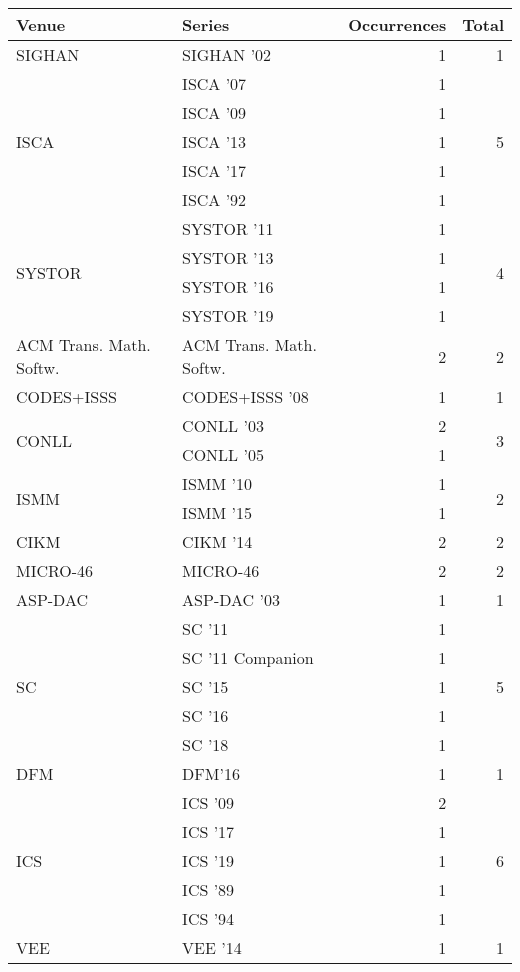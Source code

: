 \begin{table*}[t]
\begin{tabular}{llrr}
Venue & Series & Occurrences & Total\\\hline
\multirow{1}{*}{SIGHAN } & SIGHAN '02 & 1 & \multirow{1}{*}{1}\\
\multirow{5}{*}{ISCA } & ISCA '07 & 1 & \multirow{5}{*}{5}\\
& ISCA '09 & 1 &\\
& ISCA '13 & 1 &\\
& ISCA '17 & 1 &\\
& ISCA '92 & 1 &\\
\multirow{4}{*}{SYSTOR } & SYSTOR '11 & 1 & \multirow{4}{*}{4}\\
& SYSTOR '13 & 1 &\\
& SYSTOR '16 & 1 &\\
& SYSTOR '19 & 1 &\\
\multirow{1}{*}{ACM Trans. Math. Softw.} & ACM Trans. Math. Softw. & 2 & \multirow{1}{*}{2}\\
\multirow{1}{*}{CODES+ISSS } & CODES+ISSS '08 & 1 & \multirow{1}{*}{1}\\
\multirow{2}{*}{CONLL } & CONLL '03 & 2 & \multirow{2}{*}{3}\\
& CONLL '05 & 1 &\\
\multirow{2}{*}{ISMM } & ISMM '10 & 1 & \multirow{2}{*}{2}\\
& ISMM '15 & 1 &\\
\multirow{1}{*}{CIKM } & CIKM '14 & 2 & \multirow{1}{*}{2}\\
\multirow{1}{*}{MICRO-46} & MICRO-46 & 2 & \multirow{1}{*}{2}\\
\multirow{1}{*}{ASP-DAC } & ASP-DAC '03 & 1 & \multirow{1}{*}{1}\\
\multirow{5}{*}{SC } & SC '11 & 1 & \multirow{5}{*}{5}\\
& SC '11 Companion & 1 &\\
& SC '15 & 1 &\\
& SC '16 & 1 &\\
& SC '18 & 1 &\\
\multirow{1}{*}{DFM} & DFM'16 & 1 & \multirow{1}{*}{1}\\
\multirow{5}{*}{ICS } & ICS '09 & 2 & \multirow{5}{*}{6}\\
& ICS '17 & 1 &\\
& ICS '19 & 1 &\\
& ICS '89 & 1 &\\
& ICS '94 & 1 &\\
\multirow{1}{*}{VEE } & VEE '14 & 1 & \multirow{1}{*}{1}\\

\end{tabular}
\end{table*}
